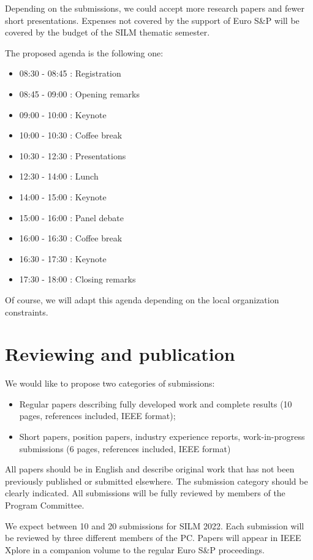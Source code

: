 \documentclass[a4paper,11pt]{article} %
\numberwithin{equation}{section} %
\numberwithin{figure}{section} %
\numberwithin{table}{section} %
\begin{document}
Depending on the submissions, we could accept more research papers and
fewer short presentations. Expenses not covered by the support of Euro S\&P
will be covered by the budget of the SILM thematic semester.

The proposed agenda is the following one:
%
\begin{itemize}
    \item 08:30 - 08:45 : Registration
    \item 08:45 - 09:00 : Opening remarks
    \item 09:00 - 10:00 : Keynote
    \item 10:00 - 10:30 : Coffee break
    \item 10:30 - 12:30 : Presentations
    \item 12:30 - 14:00 : Lunch
    \item 14:00 - 15:00 : Keynote
    \item 15:00 - 16:00 : Panel debate
    \item 16:00 - 16:30 : Coffee break
    \item 16:30 - 17:30 : Keynote
    \item 17:30 - 18:00 : Closing remarks
\end{itemize}
%
Of course, we will adapt this agenda depending on the local organization constraints.

\section{Reviewing and publication}

We would like to propose two categories of submissions:
%
\begin{itemize}
%
    \item Regular papers describing fully developed work and complete
results (10 pages, references included, IEEE format);
%
    \item Short papers, position papers, industry experience reports,
work-in-progress submissions (6 pages, references included, IEEE format)
%
\end{itemize}

All papers should be in English and describe original work that has not
been previously published or submitted elsewhere. The submission category
should be clearly indicated. All submissions will be fully reviewed by
members of the Program Committee.

We expect between 10 and 20 submissions for SILM 2022. Each submission will
be reviewed by three different members of the PC.
Papers will appear in IEEE Xplore in a companion volume to the regular Euro
S\&P proceedings.
\end{document}
